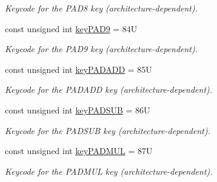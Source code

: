 \begin{DoxyCompactItemize}
\begin{DoxyCompactList}\small\item\em Keycode for the {\ttfamily P\+A\+D8} key (architecture-\/dependent). \end{DoxyCompactList}\item 
\mbox{\label{namespacecimg__library__suffixed_1_1cimg_a17ca0bdcbd992a9664883088f23ac80e}} 
const unsigned int \hyperlink{namespacecimg__library__suffixed_1_1cimg_a17ca0bdcbd992a9664883088f23ac80e}{key\+P\+A\+D9} = 84U
\begin{DoxyCompactList}\small\item\em Keycode for the {\ttfamily P\+A\+D9} key (architecture-\/dependent). \end{DoxyCompactList}\item 
\mbox{\label{namespacecimg__library__suffixed_1_1cimg_a4e6779acc399edb2df954aa87cbecb57}} 
const unsigned int \hyperlink{namespacecimg__library__suffixed_1_1cimg_a4e6779acc399edb2df954aa87cbecb57}{key\+P\+A\+D\+A\+DD} = 85U
\begin{DoxyCompactList}\small\item\em Keycode for the {\ttfamily P\+A\+D\+A\+DD} key (architecture-\/dependent). \end{DoxyCompactList}\item 
\mbox{\label{namespacecimg__library__suffixed_1_1cimg_aacc1c9fcc739dbba6db831b5ad270470}} 
const unsigned int \hyperlink{namespacecimg__library__suffixed_1_1cimg_aacc1c9fcc739dbba6db831b5ad270470}{key\+P\+A\+D\+S\+UB} = 86U
\begin{DoxyCompactList}\small\item\em Keycode for the {\ttfamily P\+A\+D\+S\+UB} key (architecture-\/dependent). \end{DoxyCompactList}\item 
\mbox{\label{namespacecimg__library__suffixed_1_1cimg_aec9c34722a76b68dee72675560d6a4b4}} 
const unsigned int \hyperlink{namespacecimg__library__suffixed_1_1cimg_aec9c34722a76b68dee72675560d6a4b4}{key\+P\+A\+D\+M\+UL} = 87U
\begin{DoxyCompactList}\small\item\em Keycode for the {\ttfamily P\+A\+D\+M\+UL} key (architecture-\/dependent). \end{DoxyCompactList}\item 

\end{DoxyCompactItemize}
